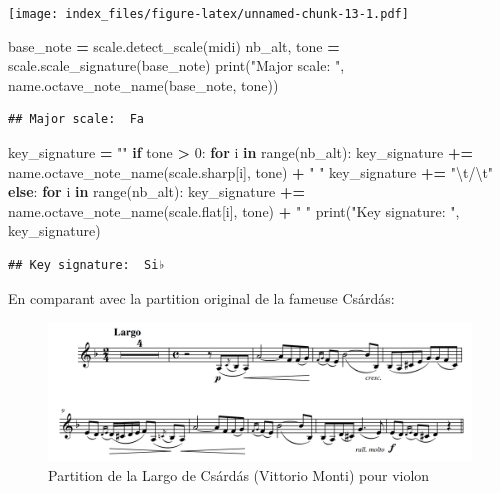 \documentclass[french,]{article}
\newenvironment{Shaded}{\begin{snugshade}}{\end{snugshade}}
\newcommand{\BuiltInTok}[1]{#1}
\newcommand{\CharTok}[1]{\textcolor[rgb]{0.31,0.60,0.02}{#1}}
\newcommand{\ControlFlowTok}[1]{\textcolor[rgb]{0.13,0.29,0.53}{\textbf{#1}}}
\newcommand{\DecValTok}[1]{\textcolor[rgb]{0.00,0.00,0.81}{#1}}
\newcommand{\KeywordTok}[1]{\textcolor[rgb]{0.13,0.29,0.53}{\textbf{#1}}}
\newcommand{\NormalTok}[1]{#1}
\newcommand{\OperatorTok}[1]{\textcolor[rgb]{0.81,0.36,0.00}{\textbf{#1}}}
\newcommand{\StringTok}[1]{\textcolor[rgb]{0.31,0.60,0.02}{#1}}
\begin{document}
\texttt{[image: index\_files/figure-latex/unnamed-chunk-13-1.pdf]}

\begin{Shaded}
\begin{Highlighting}[]
\NormalTok{base_note }\OperatorTok{=}\NormalTok{ scale.detect_scale(midi)}
\NormalTok{nb_alt, tone }\OperatorTok{=}\NormalTok{ scale.scale_signature(base_note)}
\BuiltInTok{print}\NormalTok{(}\StringTok{"Major scale: "}\NormalTok{, name.octave_note_name(base_note, tone))}
\end{Highlighting}
\end{Shaded}

\begin{verbatim}
## Major scale:  Fa
\end{verbatim}

\begin{Shaded}
\begin{Highlighting}[]
\NormalTok{key_signature }\OperatorTok{=} \StringTok{""}
\ControlFlowTok{if}\NormalTok{ tone }\OperatorTok{>} \DecValTok{0}\NormalTok{:}
    \ControlFlowTok{for}\NormalTok{ i }\KeywordTok{in} \BuiltInTok{range}\NormalTok{(nb_alt):}
\NormalTok{        key_signature }\OperatorTok{+=}\NormalTok{ name.octave_note_name(scale.sharp[i], tone) }\OperatorTok{+} \StringTok{" "}
\NormalTok{    key_signature }\OperatorTok{+=} \StringTok{"}\CharTok{\textbackslash{}t}\StringTok{/}\CharTok{\textbackslash{}t}\StringTok{"}
\ControlFlowTok{else}\NormalTok{:}
    \ControlFlowTok{for}\NormalTok{ i }\KeywordTok{in} \BuiltInTok{range}\NormalTok{(nb_alt):}
\NormalTok{        key_signature }\OperatorTok{+=}\NormalTok{ name.octave_note_name(scale.flat[i], tone) }\OperatorTok{+} \StringTok{" "}
\BuiltInTok{print}\NormalTok{(}\StringTok{"Key signature: "}\NormalTok{, key_signature)}
\end{Highlighting}
\end{Shaded}

\begin{verbatim}
## Key signature:  Si♭
\end{verbatim}

En comparant avec la partition original de la fameuse Csárdás:

\begin{figure}
\centering
\includegraphics{img/czardas_partition.png}
\caption{Partition de la Largo de Csárdás (Vittorio Monti) pour violon}
\end{figure}
\end{document}
